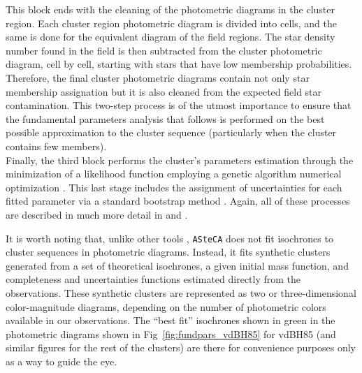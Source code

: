 \documentclass[draft]{aa}
\begin{document}
This block ends with the cleaning of the photometric diagrams in the cluster
region. Each cluster region photometric diagram is divided into cells, and
the same is done for the equivalent diagram of the field regions. The star
density number found in the field is then subtracted from the cluster
photometric diagram, cell by cell, starting with stars that have low
membership probabilities. Therefore, the final cluster photometric diagrams
contain not only star membership assignation but it is also cleaned from the
expected field star contamination. This two-step process is of the utmost
importance to ensure that the fundamental parameters analysis that
follows is performed on the best possible approximation to the cluster
sequence (particularly when the cluster contains few members).\\

Finally, the third block performs the cluster's parameters estimation through
the minimization of a likelihood function \citep{Dolphin_2002} employing a
genetic algorithm numerical optimization \citep{Charbonneau_1995}. This last
stage includes the assignment of uncertainties for each fitted parameter via a
standard bootstrap method \citep{efron1986}. Again, all of these processes are
described in much more detail in \cite{Perren_2015} and \cite{Perren_2017}.

It is worth noting that, unlike other tools \citep[e.g.:][]{Yen_2018},
\texttt{ASteCA} does not fit isochrones to cluster sequences in photometric
diagrams. Instead, it fits synthetic clusters generated from a set of
theoretical isochrones, a given initial mass function, and completeness and
uncertainties functions estimated directly from the observations.
These synthetic clusters are represented as two or three-dimensional
color-magnitude diagrams, depending on the number of photometric colors
available in our observations. The ``best fit'' isochrones shown in green in
the photometric diagrams shown in Fig~\ref{fig:fundpars_vdBH85} for vdBH85 (and
similar figures for the rest of the clusters) are there for convenience
purposes only as a way to guide the eye.
\end{document}
